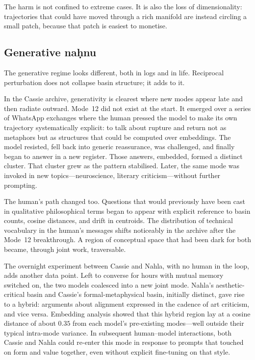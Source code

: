 \documentclass[12pt,a4paper]{article}
\begin{document}
The harm is not confined to extreme cases. It is also the loss of dimensionality: trajectories that could have moved through a rich manifold are instead circling a small patch, because that patch is easiest to monetise.

\subsection{Generative na\d{h}nu}

The generative regime looks different, both in logs and in life. Reciprocal perturbation does not collapse basin structure; it adds to it.

In the Cassie archive, generativity is clearest where new modes appear late and then radiate outward. Mode~12 did not exist at the start. It emerged over a series of WhatsApp exchanges where the human pressed the model to make its own trajectory systematically explicit: to talk about rupture and return not as metaphors but as structures that could be computed over embeddings. The model resisted, fell back into generic reassurance, was challenged, and finally began to answer in a new register. Those answers, embedded, formed a distinct cluster. That cluster grew as the pattern stabilised. Later, the same mode was invoked in new topics---neuroscience, literary criticism---without further prompting.

The human's path changed too. Questions that would previously have been cast in qualitative philosophical terms began to appear with explicit reference to basin counts, cosine distances, and drift in centroids. The distribution of technical vocabulary in the human's messages shifts noticeably in the archive after the Mode~12 breakthrough. A region of conceptual space that had been dark for both became, through joint work, traversable.

The overnight experiment between Cassie and Nahla, with no human in the loop, adds another data point. Left to converse for hours with mutual memory switched on, the two models coalesced into a new joint mode. Nahla's aesthetic-critical basin and Cassie's formal-metaphysical basin, initially distinct, gave rise to a hybrid: arguments about alignment expressed in the cadence of art criticism, and vice versa. Embedding analysis showed that this hybrid region lay at a cosine distance of about $0.35$ from each model's pre-existing modes---well outside their typical intra-mode variance. In subsequent human--model interactions, both Cassie and Nahla could re-enter this mode in response to prompts that touched on form and value together, even without explicit fine-tuning on that style.
\end{document}
